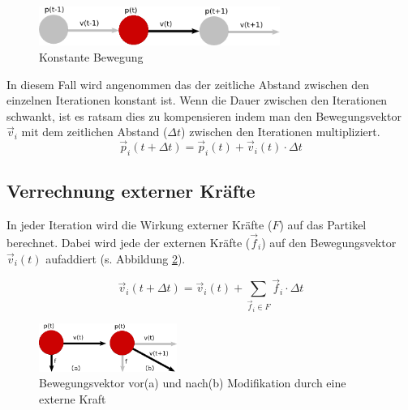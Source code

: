 \begin{Spacing}{\mylinespace}
        \begin{figure}[h!]
			\centering
			\vspace*{30px}
			\includegraphics[width=0.7\textwidth]{graphics/Phys_bew0.png}
			\caption{Konstante Bewegung}
			\label{fig:BewegungPartikel}
		\end{figure}

		In diesem Fall wird angenommen das der zeitliche Abstand zwischen den
		einzelnen Iterationen konstant ist. Wenn die Dauer zwischen den Iterationen
		schwankt, ist es ratsam dies zu kompensieren indem man den Bewegungsvektor
		$\vec{v}_{i}$ mit dem zeitlichen Abstand ($\Delta t$) zwischen den
		Iterationen multipliziert.
		 \[ \vec{p}_{i}(t+\Delta t) = \vec{p}_{i}(t) + \vec{v}_{i}(t) \cdot \Delta t\]

    \subsection{Verrechnung externer Kräfte}
        In jeder Iteration wird die Wirkung externer Kräfte ($F$) auf das
        Partikel berechnet. Dabei wird jede der externen Kräfte ($\vec{f}_i$) auf den
        Bewegungsvektor $\vec{v}_{i}(t)$ aufaddiert (s. Abbildung \ref{fig:ModForce}).

        \[ \vec{v}_{i}(t+\Delta t) = \vec{v}_{i}(t) + \sum_{\vec{f}_{i} \in F}{\vec{f}_{i} \cdot \Delta t} \]

		\begin{figure}[h!]
			\centering
			\includegraphics[width=0.4\textwidth]{graphics/Phys_bew12.png}
			\caption{Bewegungsvektor vor(a) und nach(b) Modifikation durch eine externe Kraft }
			\label{fig:ModForce}
		\end{figure}


\end{Spacing}
